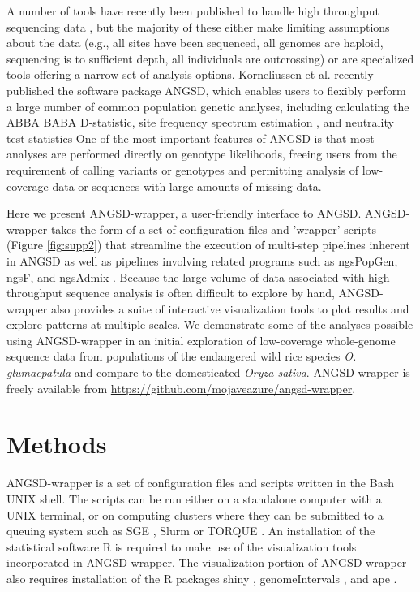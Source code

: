 \documentclass[10pt,a4paper]{article}
\newcommand{\og}{\emph{O. glumaepatula }}
\begin{document}
A number of tools have recently been published to handle high throughput sequencing data \citep{garrigan2013popbam, purcell2007plink, danecek2011variant, hutter2006genome}, but the majority of these either make limiting assumptions about the data (e.g., all sites have been sequenced, all genomes are haploid, sequencing is to sufficient depth, all individuals are outcrossing) or are specialized tools offering a narrow set of analysis options. 
Korneliussen et al. \citep{korneliussen2014angsd} recently published the software package ANGSD, which enables users to flexibly perform a large number of common population genetic analyses, including calculating the ABBA BABA D-statistic, site frequency spectrum estimation \citep{pmid22911679}, and neutrality test statistics \citep{korneliussen_calculation_2013}
One of the most important features of ANGSD is that most analyses are performed directly on genotype likelihoods, freeing users from the requirement of calling variants or genotypes and permitting analysis of low-coverage data or sequences with large amounts of missing data. 

Here we present ANGSD-wrapper, a user-friendly interface to ANGSD. 
ANGSD-wrapper takes the form of a set of configuration files and 'wrapper' scripts (Figure \ref{fig:supp2}) that streamline the execution of multi-step pipelines inherent in ANGSD as well as pipelines involving related programs such as ngsPopGen, ngsF\citep{vieira2013estimating}, and ngsAdmix \citep{pmid24026093}.
Because the large volume of data associated with high throughput sequence analysis is often difficult to explore by hand, ANGSD-wrapper also provides a suite of interactive visualization tools to plot results and explore patterns at multiple scales.  
We demonstrate some of the analyses possible using ANGSD-wrapper in an initial exploration of low-coverage whole-genome sequence data from populations of the endangered wild rice species \og  and compare to the domesticated \emph{Oryza sativa}.
ANGSD-wrapper is freely available from \url{https://github.com/mojaveazure/angsd-wrapper}.

\section*{Methods}
ANGSD-wrapper is a set of configuration files and scripts written in the Bash UNIX shell.  
The scripts can be run either on a standalone computer with a UNIX terminal, or on computing clusters where they can be submitted to a queuing system such as SGE \citep{Microsystems):2001:SGE:560889.792378}, Slurm \citep{Jette02slurm:simple} or TORQUE \citep{Staples:2006:TRM:1188455.1188464}.  
An installation of the statistical software R \citep{Rcitation} is required to make use of the visualization tools incorporated in ANGSD-wrapper.  
The visualization portion of ANGSD-wrapper also requires installation of the R packages shiny \citep{shiny}, genomeIntervals \citep{genomeIntervals}, and ape \citep{APE}.
\end{document}
